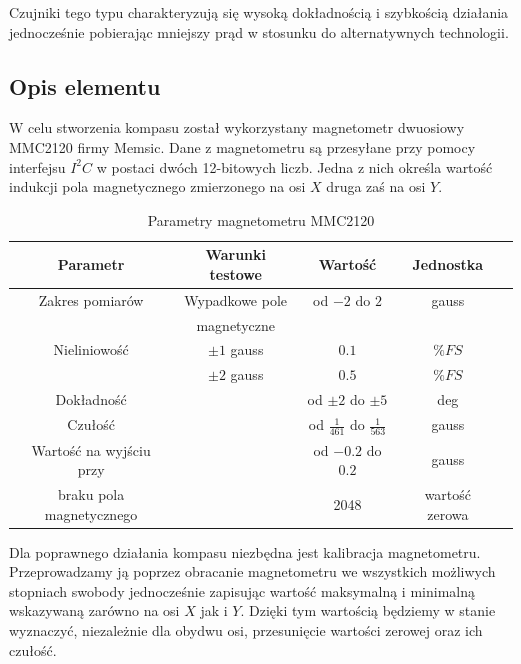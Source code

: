Czujniki tego typu charakteryzują się wysoką dokładnością i szybkością działania jednocześnie pobierając mniejszy prąd w stosunku do alternatywnych technologii.

\subsection{Opis elementu}
W celu stworzenia kompasu został wykorzystany magnetometr dwuosiowy MMC2120 firmy Memsic. Dane z magnetometru są przesyłane przy pomocy interfejsu $I^{2}C$ w postaci dwóch 12-bitowych liczb. Jedna z nich określa wartość indukcji pola magnetycznego zmierzonego na osi $X$ druga zaś na osi $Y$. 
\\

\begin{table}[hb]
\centering
\caption{Parametry magnetometru MMC2120}
   	\begin{tabular}{ | c | c | c | c | p{1.75cm} |} \hline
   		Parametr & Warunki testowe & Wartość & Jednostka \\ \hline
   		Zakres pomiarów & Wypadkowe pole & od $-2$ do $2$ & gauss\\
		& magnetyczne & & \\ \hline
   		Nieliniowość & $\pm 1$ gauss & $0.1$ & $\% FS$ \\
   		& $\pm 2$ gauss & $0.5$ & $\% FS$ \\ \hline
   		Dokładność & & od $\pm 2$ do $\pm 5$ & deg \\ \hline
   		Czułość & & od $\frac{1}{461}$ do $\frac{1}{563}$ & gauss \\ \hline
   		Wartość na wyjściu przy & & od $-0.2$ do $0.2$ & gauss \\
   		braku pola magnetycznego & & 2048 & wartość zerowa \\ \hline
   	\end{tabular}
\label{tab:MMC2120Char}
\end{table}

Dla poprawnego działania kompasu niezbędna jest kalibracja magnetometru. Przeprowadzamy ją poprzez obracanie magnetometru we wszystkich możliwych stopniach swobody jednocześnie zapisując wartość maksymalną i minimalną wskazywaną zarówno na osi $X$ jak i $Y$. Dzięki tym wartością będziemy w stanie wyznaczyć, niezależnie dla obydwu osi, przesunięcie wartości zerowej oraz ich czułość.

